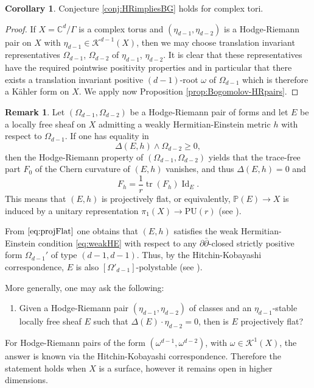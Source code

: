 \documentclass[a4,reqno]{amsart}
\theoremstyle{definition}
\newtheorem{corollary}[theorem]{Corollary}
\newtheorem{remark}[theorem]{Remark}
\def\cK{\mathcal K}
\newcommand{\C}{\mathbb{C}}
\renewcommand{\P}{\mathbb{P}}
\DeclareMathOperator{\Id}{Id}
\DeclareMathOperator{\tr}{tr}
\numberwithin{equation}{section}
\begin{document}
\begin{corollary}\label{cor:tori}  
    Conjecture \ref{conj:HRimpliesBG} holds for complex tori.
\end{corollary}
\begin{proof}
    If $X=\C^d/\Gamma$ is a complex torus and $(\eta_{d-1},\eta_{d-2})$ is a Hodge-Riemann pair on $X$ with $\eta_{d-1}\in\cK^{d-1}(X)$, then we may choose translation invariant representatives $\Omega_{d-1}$, $\Omega_{d-2}$  of $\eta_{d-1}$, $\eta_{d-2}$. It is clear that these representatives have the required pointwise positivity properties and in particular that there exists a translation invariant positive $(d-1)$-root $\omega$ of $\Omega_{d-1}$ which is therefore a K\"ahler form on $X$. We apply now Proposition \ref{prop:Bogomolov-HRpairs}. 
\end{proof}


\begin{remark}\label{rem:projectively-flat}
Let $(\Omega_{d-1},\Omega_{d-2})$ be a Hodge-Riemann pair of forms and let $E$ be a locally free sheaf on $X$ admitting a weakly Hermitian-Einstein metric $h$ with respect to $\Omega_{d-1}$. If one has equality in 
\[
    \Delta(E,h)\wedge \Omega_{d-2}\ge 0,
\]
then the Hodge-Riemann property of $(\Omega_{d-1},\Omega_{d-2})$ yields that the trace-free part $F_0$ of the Chern curvature of $(E,h)$ vanishes, and thus $\Delta(E,h) = 0$ and 
\begin{equation}\label{eq:projFlat}
      F_h = \frac{1}{r}\tr(F_h)\Id_E.
\end{equation}
This means that $(E,h)$ is projectively flat, or equivalently, $\P(E) \to X$ is induced by a unitary representation $\pi_1(X) \to \mathrm{PU}(r)$ (see \cite[Proposition 1.4.22]{KobayashiVectorBundles}). 

From $\eqref{eq:projFlat}$ one obtains that $(E,h)$ satisfies the weak Hermitian-Einstein condition \eqref{eq:weakHE} with respect to any $\partial \bar{\partial}$-closed strictly  positive form $\Omega_{d-1}'$ of type $(d-1,d-1)$. Thus, by the Hitchin-Kobayashi correspondence, $E$ is also $[\Omega'_{d-1}]$-polystable (see \cite[Theorem 2.3.2]{LuTe}). 

More generally, one may ask the following:
\begin{enumerate}
    \item[(Q)] Given a Hodge-Riemann pair $(\eta_{d-1},\eta_{d-2})$ of classes and an $\eta_{d-1}$-stable locally free sheaf $E$ such that $\Delta(E) \cdot \eta_{d-2} = 0$, then is $E$ projectively flat?
\end{enumerate}
For Hodge-Riemann pairs of the form $(\omega^{d-1},\omega^{d-2})$, with $\omega \in \cK^1(X)$, the answer is known via the Hitchin-Kobayashi correspondence. Therefore the statement holds when $X$ is a surface, however it remains open in higher dimensions.  
\end{remark}
\end{document}

